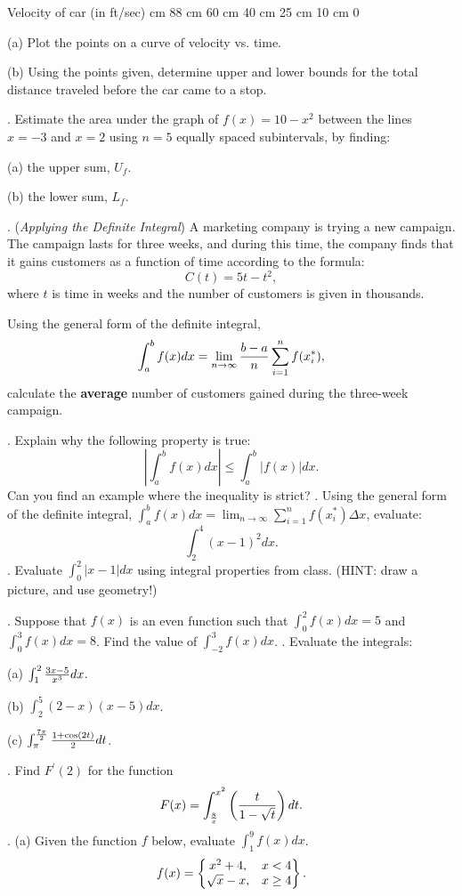 \documentclass[12pt]{article}
\begin{document}
Velocity of car (in ft/sec)  cm 88  cm 60  
cm 40  cm 25  cm 10  cm 0

\medskip
\noindent (a) Plot the points on a curve of velocity vs. time.

\noindent (b) Using the points given, determine upper and lower bounds 
for the total distance traveled before the car came to a stop.

\bigskip
{}.  Estimate the area under the graph of $f(x) = 10 - x^2
$ between the lines $x=-3$ and $x=2$ using $n=5$ equally spaced
subintervals, by finding:

\noindent (a) the upper sum, $U_f$.

\noindent (b) the lower sum, $L_f$.

\medskip
{}.  ({\it Applying the Definite Integral\/})
A marketing company is trying a new campaign.  The campaign lasts for 
three weeks, and during this time, the company finds that it gains 
customers as a function of time according to the formula:
$$C(t) = 5t - t^2,$$
where $t$ is time in weeks and the number of customers is given in 
thousands.

\noindent Using the general form of the definite integral,
$$\int_a^b f(x) dx = \lim_{n \to \infty} {{b-a}\over{n}} \sum_{i=1}^{n} 
f(x_i^*),$$
calculate the {\bf average} number of customers gained during the 
three-week campaign.

\medskip
{}.  Explain why the following property is true:
$$|\int_a^b f(x) dx | \leq \int_a^b |f(x)| dx.$$
Can you find an example where the inequality is strict?
\medskip
{}.  Using the general form of the definite integral,
$\int_a^b f(x) dx = \lim_{n \to \infty} \sum_{i=1}^{n} 
f(x_i^*) \Delta x$, evaluate:
$$\int_2^4 (x-1)^2 dx.$$
\medskip
{}.  Evaluate $\int_{0}^{2} |x-1| dx$ using integral properties 
from class.  (HINT: draw a picture, and use geometry!)

\medskip
{}.  Suppose that $f(x)$ is an even function such 
that $\int_0^2 f(x)dx = 5$ and
$\int_0^3 f(x)dx = 8$. Find the value of $\int_{-2}^3 f(x)dx$.
\medskip
{}.  Evaluate the integrals:

\noindent (a) $\int_{1}^{2} {{3x-5}\over{x^3}} dx$.

\noindent (b) $\int_2^5 (2-x)(x-5) dx$.

\noindent (c) $\int_{\pi}^{{{7 \pi}\over{2}}} {{1 + \cos(2t)}\over{2}} dt$.

\bigskip
{}.  Find $F^{\prime}(2)$ for the function
$$F(x) = \int_{{8}\over{x}}^{x^2} \left ( {{t}\over{1 - \sqrt{t}}} 
\right ) dt.$$
\bigskip
{}.  (a) Given the function $f$ below, evaluate $\int_1^9 f(x) dx$.
$$f(x) = \left \{ \begin{matrix} x^2 + 4, & x < 4 \cr \sqrt{x} - x, & x \ge 4 \end{matrix} \right\}.$$ 
\end{document}
